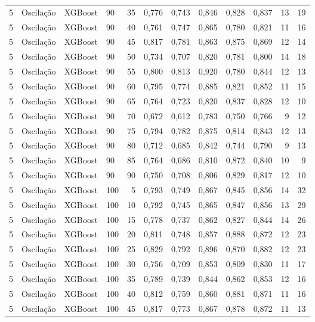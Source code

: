 \begin{longtable}{ccclrrrrrrrr}
5 & Oscilação & XGBoost & 90 & 35 & 0,776 & 0,743 & 0,846 & 0,828 & 0,837 & 13 & 19 \\
5 & Oscilação & XGBoost & 90 & 40 & 0,761 & 0,747 & 0,865 & 0,780 & 0,821 & 11 & 16 \\
5 & Oscilação & XGBoost & 90 & 45 & 0,817 & 0,781 & 0,863 & 0,875 & 0,869 & 12 & 14 \\
5 & Oscilação & XGBoost & 90 & 50 & 0,734 & 0,707 & 0,820 & 0,781 & 0,800 & 14 & 18 \\
5 & Oscilação & XGBoost & 90 & 55 & 0,800 & 0,813 & 0,920 & 0,780 & 0,844 & 12 & 13 \\
5 & Oscilação & XGBoost & 90 & 60 & 0,795 & 0,774 & 0,885 & 0,821 & 0,852 & 11 & 15 \\
5 & Oscilação & XGBoost & 90 & 65 & 0,764 & 0,723 & 0,820 & 0,837 & 0,828 & 12 & 10 \\
5 & Oscilação & XGBoost & 90 & 70 & 0,672 & 0,612 & 0,783 & 0,750 & 0,766 & 9 & 12 \\
5 & Oscilação & XGBoost & 90 & 75 & 0,794 & 0,782 & 0,875 & 0,814 & 0,843 & 12 & 13 \\
5 & Oscilação & XGBoost & 90 & 80 & 0,712 & 0,685 & 0,842 & 0,744 & 0,790 & 9 & 13 \\
5 & Oscilação & XGBoost & 90 & 85 & 0,764 & 0,686 & 0,810 & 0,872 & 0,840 & 10 & 9 \\
5 & Oscilação & XGBoost & 90 & 90 & 0,750 & 0,708 & 0,806 & 0,829 & 0,817 & 12 & 10 \\
5 & Oscilação & XGBoost & 100 & 5 & 0,793 & 0,749 & 0,867 & 0,845 & 0,856 & 14 & 32 \\
5 & Oscilação & XGBoost & 100 & 10 & 0,792 & 0,745 & 0,865 & 0,847 & 0,856 & 13 & 29 \\
5 & Oscilação & XGBoost & 100 & 15 & 0,778 & 0,737 & 0,862 & 0,827 & 0,844 & 14 & 26 \\
5 & Oscilação & XGBoost & 100 & 20 & 0,811 & 0,748 & 0,857 & 0,888 & 0,872 & 12 & 23 \\
5 & Oscilação & XGBoost & 100 & 25 & 0,829 & 0,792 & 0,896 & 0,870 & 0,882 & 12 & 23 \\
5 & Oscilação & XGBoost & 100 & 30 & 0,756 & 0,709 & 0,853 & 0,809 & 0,830 & 11 & 17 \\
5 & Oscilação & XGBoost & 100 & 35 & 0,789 & 0,739 & 0,844 & 0,862 & 0,853 & 12 & 16 \\
5 & Oscilação & XGBoost & 100 & 40 & 0,812 & 0,759 & 0,860 & 0,881 & 0,871 & 11 & 16 \\
5 & Oscilação & XGBoost & 100 & 45 & 0,817 & 0,773 & 0,867 & 0,878 & 0,872 & 11 & 13 \\

\end{longtable}

